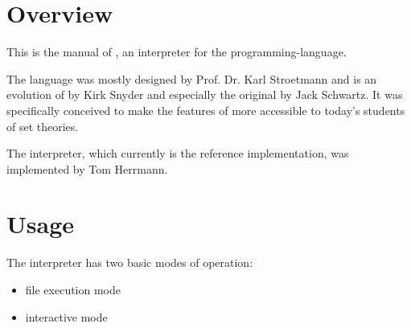 \def\myDocumentTypeArticle{-}


\globalDate{\today}






\begin{titlepage}
\maketitle
\vfill
\tableofcontents
\end{titlepage}

\section{Overview}

This is the manual of \setlX, an interpreter for the \SetlX{} programming-language.

The \SetlX{} language was mostly designed by Prof. Dr. Karl Stroetmann and is an evolution of \SetlTwo{} by Kirk Snyder and especially the original \Setl{} by Jack Schwartz. It was specifically conceived to make the features of \Setl{} more accessible to today's students of set theories.

The \setlX{} interpreter, which currently is the \SetlX{} reference implementation, was implemented by Tom Herrmann.

\section{Usage}

The \setlX{} interpreter has two basic modes of operation:
\begin{itemize}
	\item file execution mode
	\item interactive mode
\end{itemize}


